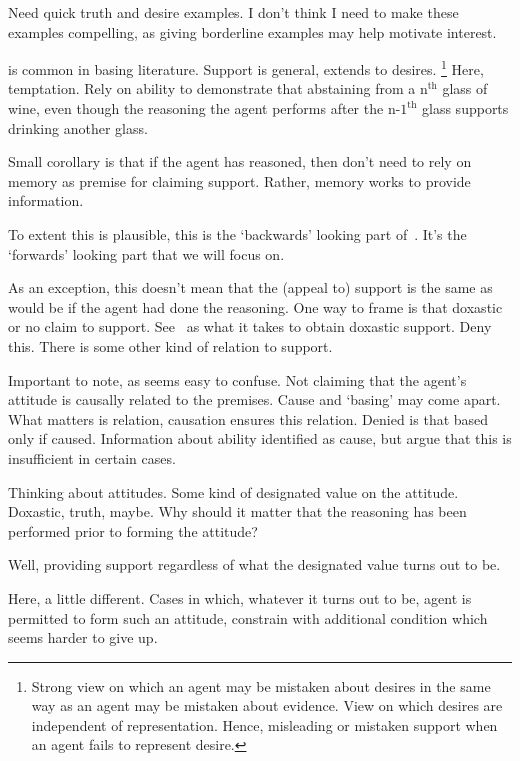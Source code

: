 \begin{note}[Examples]
  Need quick truth and desire examples.
  I don't think I need to make these examples compelling, as giving borderline examples may help motivate interest.

  \uRa{} is common in basing literature.
  Support is general, extends to desires.\nolinebreak
  \footnote{
    Strong view on which an agent may be mistaken about desires in the same way as an agent may be mistaken about evidence.
    View on which desires are independent of representation.
    Hence, misleading or mistaken support when an agent fails to represent desire.
  }
  Here, temptation.
  Rely on ability to demonstrate that abstaining from a \(\text{n}^{\text{th}}\) glass of wine, even though the reasoning the agent performs after the \(\text{n-1}^{\text{th}}\) glass supports drinking another glass.
\end{note}

\begin{note}
  Small corollary is that if the agent has reasoned, then don't need to rely on memory as premise for claiming support.
  Rather, memory works to provide information.

  To extent this is plausible, this is the `backwards' looking part of~\rC{}.
  It's the `forwards' looking part that we will focus on.
\end{note}

\begin{note}
  As an exception, this doesn't mean that the (appeal to) support is the same as would be if the agent had done the reasoning.
  One way to frame is that doxastic or no claim to support.
  See~\uRa{} as what it takes to obtain doxastic support.
  Deny this.
  There is some other kind of relation to support.
\end{note}

\begin{note}[No causality]
  Important to note, as seems easy to confuse.
  Not claiming that the agent's attitude is causally related to the premises.
  Cause and `basing' may come apart.
  What matters is relation, causation ensures this relation.
  Denied is that based only if caused.
  Information about ability identified as cause, but argue that this is insufficient in certain cases.
\end{note}

\begin{note}
  Thinking about attitudes.
  Some kind of designated value on the attitude.
  Doxastic, truth, maybe.
  Why should it matter that the reasoning has been performed prior to forming the attitude?

  Well, providing support regardless of what the designated value turns out to be.

  Here, a little different.
  Cases in which, whatever it turns out to be, agent is permitted to form such an attitude, constrain with additional condition which seems harder to give up.
\end{note}

